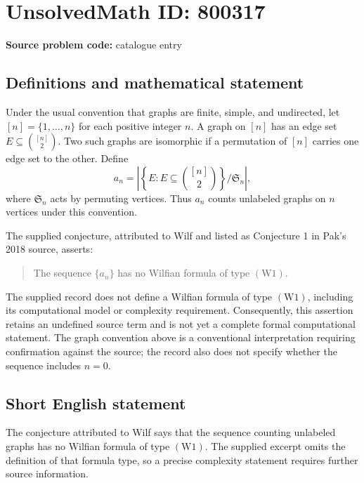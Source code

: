 \documentclass[11pt]{article}
\begin{document}
\section*{UnsolvedMath ID: 800317}
\textbf{Source problem code:} catalogue entry
\subsection{Definitions and mathematical statement}
Under the usual convention that graphs are finite, simple, and undirected, let \([n]=\{1,\ldots,n\}\) for each positive integer \(n\). A graph on \([n]\) has an edge set \(E\subseteq\binom{[n]}{2}\). Two such graphs are isomorphic if a permutation of \([n]\) carries one edge set to the other. Define
\[
 a_n=\left|\left\{E:E\subseteq\binom{[n]}{2}\right\}/\mathfrak S_n\right|,
\]
where \(\mathfrak S_n\) acts by permuting vertices. Thus \(a_n\) counts unlabeled graphs on \(n\) vertices under this convention.

The supplied conjecture, attributed to Wilf and listed as Conjecture 1 in Pak's 2018 source, asserts:
\begin{quote}
The sequence \(\{a_n\}\) has no Wilfian formula of type \(\mathrm{(W1)}\).
\end{quote}
The supplied record does not define a Wilfian formula of type \(\mathrm{(W1)}\), including its computational model or complexity requirement. Consequently, this assertion retains an undefined source term and is not yet a complete formal computational statement. The graph convention above is a conventional interpretation requiring confirmation against the source; the record also does not specify whether the sequence includes \(n=0\).
\subsection{Short English statement}
The conjecture attributed to Wilf says that the sequence counting unlabeled graphs has no Wilfian formula of type \(\mathrm{(W1)}\). The supplied excerpt omits the definition of that formula type, so a precise complexity statement requires further source information.
\end{document}
